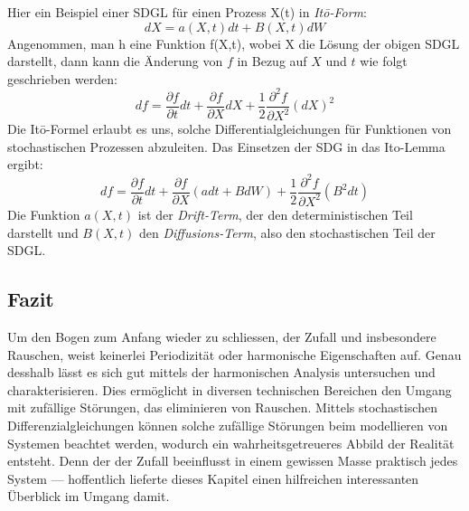 Hier ein Beispiel einer SDGL für einen Prozess X(t) in \textit{Itō-Form}:
\begin{equation}
	dX = a(X,t) dt + B(X,t) dW
\end{equation}
Angenommen, man h eine Funktion f(X,t), wobei X die Lösung der obigen SDGL darstellt, dann kann die Änderung von $ f $ in Bezug auf $ X $ und $ t $ wie folgt geschrieben werden:
\begin{equation}
	df = \frac{\partial f}{\partial t} dt + \frac{\partial f}{\partial X} dX + \frac{1}{2} \frac{\partial^2 f}{\partial X^2} (dX)^2	
\end{equation}
Die Itō-Formel erlaubt es uns, solche Differentialgleichungen für Funktionen von stochastischen Prozessen abzuleiten. Das Einsetzen der SDG in das Ito-Lemma ergibt:
\begin{equation}
	df = \frac{\partial f}{\partial t} dt + \frac{\partial f}{\partial X} (a dt + B dW) + \frac{1}{2} \frac{\partial^2 f}{\partial X^2} (B^2 dt)
\end{equation}
Die Funktion $ a(X,t) $ ist der \textit{Drift-Term}, der den deterministischen Teil darstellt und $ B(X,t) $ den \textit{Diffusions-Term}, also den stochastischen Teil der SDGL.

\subsection{Fazit\label{brown:fazit}}

Um den Bogen zum Anfang wieder zu schliessen, der Zufall und insbesondere Rauschen, weist keinerlei Periodizität oder harmonische Eigenschaften auf. Genau desshalb lässt es sich gut mittels der harmonischen Analysis untersuchen und charakterisieren. Dies ermöglicht in diversen technischen Bereichen den Umgang mit zufällige Störungen, das eliminieren von Rauschen. 
Mittels stochastischen Differenzialgleichungen können solche zufällige Störungen beim modellieren von Systemen beachtet werden, wodurch ein wahrheitsgetreueres Abbild der Realität entsteht. Denn der der Zufall beeinflusst in einem gewissen Masse praktisch jedes System --- hoffentlich lieferte dieses Kapitel einen hilfreichen interessanten Überblick im Umgang damit.
